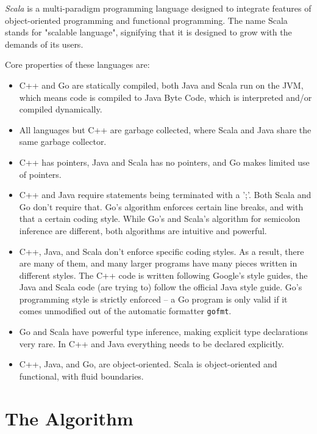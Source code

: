{\em Scala} \cite{lang-scala}
is a multi-paradigm programming language designed to integrate
features of object-oriented programming and functional
programming. The name Scala stands for "scalable language", signifying
that it is designed to grow with the demands of its users.

Core properties of these languages are:

\begin{itemize}

\item C++ and Go are statically compiled, both Java and Scala run on
  the JVM, which means code is compiled to Java Byte Code, which is 
  interpreted and/or compiled dynamically.

\item All languages but C++ are garbage collected, where Scala and
  Java share the same garbage collector.

\item C++ has pointers, Java and Scala has no pointers, and Go makes
  limited use of pointers.

\item C++ and Java require statements being terminated with a
  ';'. Both Scala and Go don't require that. Go's algorithm enforces
  certain line breaks, and with that a certain coding style. While Go's
  and Scala's algorithm for semicolon inference are 
  different, both algorithms are intuitive and powerful.

\item C++, Java, and Scala don't enforce specific coding styles. As a
  result, there are many of them, and many larger programs have many
  pieces written in different styles. The C++ code is written
  following Google's style guides, the Java and Scala code (are trying
  to) follow the official Java style guide. Go's programming style is
  strictly enforced -- a Go program is only valid if it comes
  unmodified out of the automatic formatter {\tt gofmt}.

\item Go and Scala have powerful type inference, making explicit type
  declarations very rare. In C++ and Java everything needs to be
  declared explicitly.

\item C++, Java, and Go, are object-oriented. Scala is object-oriented
  and functional, with fluid boundaries.

\end{itemize}


\section{The Algorithm}
\label{algo}

